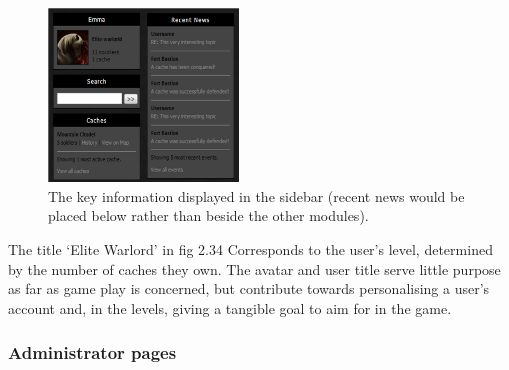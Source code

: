 \begin{figure}
	\begin{center}
	\includegraphics[width=0.45\textwidth]{images/sidebar}
	\caption{The key information displayed in the sidebar (recent news would be placed below rather than beside the other modules).}
	\label{sidebar}
	\end{center}
	\vspace{-100pt}
\end{figure}

The title ‘Elite Warlord’ in fig 2.34 Corresponds to the user’s level, determined by the number of caches they own. The avatar and user title serve little purpose as far as game play is concerned, but contribute towards personalising a user’s account and, in the levels, giving a tangible goal to aim for in the game.

\subsubsection{Administrator pages}


